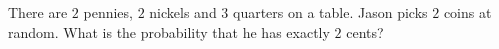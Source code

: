 There are $2$ pennies, $2$ nickels and $3$ quarters on a table. Jason picks $2$ coins at random. What is the probability that he has exactly $2$ cents?
